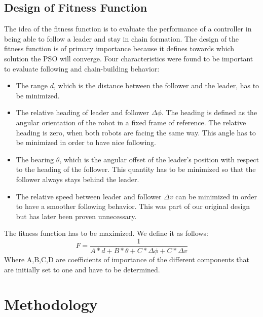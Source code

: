 \documentclass[a4, 10 pt, conference]{ieeeconf}  %
\begin{document}
\subsection{Design of Fitness Function}
The idea of the fitness function is to evaluate the performance of a controller in being able to follow a leader and stay in chain formation. The design of the fitness function is of primary importance because it defines towards which solution the PSO will converge. Four characteristics were found to be important to evaluate following and chain-building behavior:
\begin{itemize}
\item The range $d$, which is the distance between the follower and the leader, has to be minimized.
\item The relative heading of leader and follower $\Delta \phi $. The heading is defined as the angular orientation of the robot in a fixed frame of reference. The relative heading is zero, when both robots are facing the same way. This angle has to be minimized in order to have nice following. 
\item The bearing $\theta $, which is the angular offset of the leader's position with respect to the heading of the follower. This quantity has to be minimized so that the follower always stays behind the leader.
\item The relative speed between leader and follower $\Delta v $ can be minimized in order to have a smoother following behavior. This was part of our original design but has later been proven unnecessary.
\end{itemize}
The fitness function has to be maximized. We define it as follows:
\begin{equation}\label{fitness}
F=\frac{1}{A*d+B*\theta+C*\Delta \phi+C* \Delta v}
\end{equation}
Where A,B,C,D are coefficients of importance of the different components that are initially set to one and have to be determined.

\section{Methodology}

\end{document}
